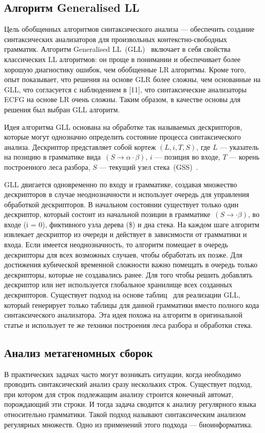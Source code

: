 \documentclass[12pt]{matmex-diploma-custom}
\begin{document}
	
    \subsection{Алгоритм Generalised LL}
	
	Цель обобщенных алгоритмов синтаксического анализа --- обеспечить создание синтаксических
	анализаторов для произвольных контекстно-свободных грамматик.
	Алгоритм Generalised LL~(GLL)~\cite{scott2010gll} включает в себя свойства классических LL алгоритмов:
	он проще в понимании и обеспечивает более хорошую диагностику ошибок, 
	чем обобщенные LR алгоритмы. Кроме того, опыт показывает, что решения на основе
	GLR более сложны, чем основанные на GLL, что согласуется с наблюдением в [11], что
	синтаксические анализаторы ECFG на основе LR очень сложны. Таким образом, в качестве
	основы для решения был выбран GLL алгоритм. 
	
	Идея алгоритма GLL основана на обработке так называемых дескрипторов, которые 
	могут однозначно определить состояние процесса синтаксического анализа. Дескриптор
	представляет собой кортеж $(L, i, T, S)$, где $L$ --- указатель на позицию в грамматике вида~$(S \to \alpha \cdot \beta)$,
	$i$ --- позиция во входе, $T$ --- корень построенного леса разбора, $S$ --- текущий узел стека~(GSS)~\cite{afroozeh2015faster}.
	
	GLL двигается одновременно по входу и грамматике, создавая множество дескрипторов
	в случае неоднозначности и использует очередь для управления обработкой дескрипторов.
	В начальном состоянии существует только один дескриптор, который состоит из начальной 
	позиции в грамматике~$(S \to \cdot \beta)$, во входе (i = 0), фиктивного узла дерева (\$)
	и дна стека. На каждом шаге алгоритм извлекает дескриптор из очереди и действует
	в зависимости от грамматики и входа. Если имеется неоднозначность, то алгоритм помещает
	в очередь дескрипторы для всех возможных случаев, чтобы обработать их позже. 
	Для достижения кубической временной сложности важно помещать в очередь только дескрипторы,
	которые не создавались ранее. Для того чтобы решить добавлять дескриптор или нет
	используется глобальное хранилище всех созданных дескрипторов.
	Существует подход на основе таблиц~\cite{ragozina} для реализации GLL, который генерирует
	только таблицы для данной грамматики вместо полного кода синтаксического анализатора.
	Эта идея похожа на алгоритм в оригинальной статье и использует те же техники
	построения леса разбора и обработки стека.
    
	\subsection{Анализ метагеномных сборок}
	В практических задачах часто могут возникать ситуации, когда необходимо проводить синтаксический анализ 
    сразу нескольких строк. Существует подход, при котором для строк подлежащим анализу строится 
    конечный автомат, порождающий эти строки. И тогда задача сводится к анализу регулярного языка относительно 
    грамматики. Такой подход называют синтаксическим анализом регулярных множеств. Одно из применений этого подхода ---
    биоинформатика.
    
\end{document}
